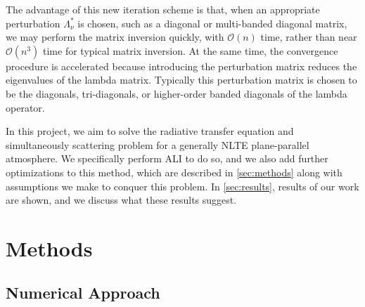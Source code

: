 \documentclass[12pt]{article}
\begin{document}
The advantage of this new iteration scheme is that, when an appropriate perturbation $\Lambda^*_\nu$ is chosen, such as a diagonal or multi-banded diagonal matrix, we may perform the matrix inversion quickly, with $\mathcal{O}(n)$ time, rather than near $\mathcal{O}(n^3)$ time for typical matrix inversion. At the same time, the convergence procedure is accelerated because introducing the perturbation matrix reduces the eigenvalues of the lambda matrix. Typically this perturbation matrix is chosen to be the diagonals, tri-diagonals, or higher-order banded diagonals of the lambda operator.

In this project, we aim to solve the radiative transfer equation and simultaneously scattering problem for a generally NLTE plane-parallel atmosphere. We specifically perform ALI to do so, and we also add further optimizations to this method, which are described in \autoref{sec:methods} along with assumptions we make to conquer this problem. In \autoref{sec:results}, results of our work are shown, and we discuss what these results suggest.


\section{Methods}
\label{sec:methods}


\subsection{Numerical Approach}
\label{sec:numerical_approach}
\end{document}
